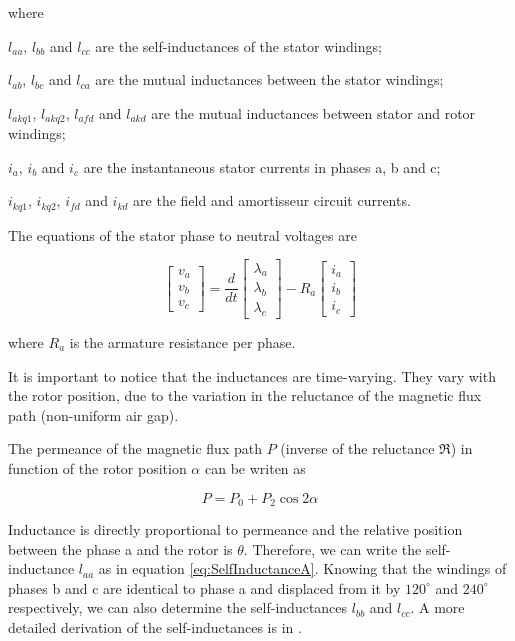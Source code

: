 where

$l_{aa}$, $l_{bb}$ and $l_{cc}$ are the self-inductances of the stator windings;

$l_{ab}$, $l_{bc}$ and $l_{ca}$ are the mutual inductances between the stator windings;

$l_{akq1}$, $l_{akq2}$, $l_{afd}$ and $l_{akd}$ are the mutual inductances between stator and rotor windings;

$i_a$, $i_b$ and $i_c$ are the instantaneous stator currents in phases a, b and c;

$i_{kq1}$, $i_{kq2}$, $i_{fd}$ and $i_{kd}$ are the field and amortisseur circuit currents.
 
The equations of the stator phase to neutral voltages are

\begin{equation} \label{eq:VotlageStator}
	\begin{bmatrix}
		v_a \\
		v_b \\
		v_c
	\end{bmatrix}
	=
	\frac{d}{dt}
	\begin{bmatrix}
		\lambda_a \\
		\lambda_b \\
		\lambda_c
	\end{bmatrix}
	-R_a
	\begin{bmatrix}
		i_a \\
		i_b \\
		i_c
	\end{bmatrix}
\end{equation}

where $R_a$ is the armature resistance per phase.

It is important to notice that the inductances are time-varying. They vary with the rotor position, due to the variation in the reluctance of the magnetic flux path (non-uniform air gap). 

The permeance of the magnetic flux path $P$ (inverse of the reluctance $\Re$) in function of the rotor position $\alpha$ can be writen as

\begin{equation}
	P = P_0 + P_2 \cos 2 \alpha
\end{equation}

Inductance is directly proportional to permeance and the relative position between the phase a and the rotor is $\theta$. Therefore, we can write the self-inductance $l_{aa}$ as in equation \ref{eq:SelfInductanceA}. Knowing that the windings of phases b and c are identical to phase a and displaced from it by  $120^{\circ}$ and $240^{\circ}$ respectively, we can also determine the self-inductances $l_{bb}$ and $l_{cc}$. A more detailed derivation of the self-inductances is in \cite{kundur1994power}.

